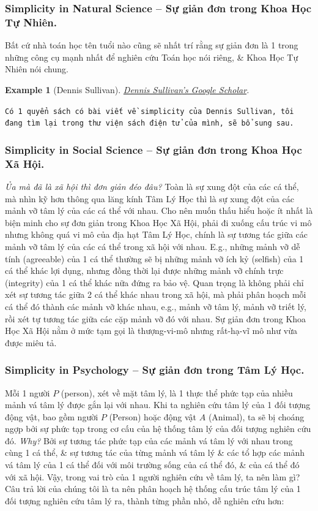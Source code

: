 \documentclass[12pt,twoside]{book}
\newtheorem{example}{Example}
\begin{document}
\subsubsection{Simplicity in Natural Science -- Sự giản đơn trong Khoa Học Tự Nhiên.} Bất cứ nhà toán học tên tuổi nào cũng sẽ nhất trí rằng sự giản đơn là 1 trong những công cụ mạnh nhất để nghiên cứu Toán học nói riêng, \& Khoa Học Tự Nhiên nói chung.

\begin{example}[{\sc Dennis Sullivan}]
	\href{https://scholar.google.com/citations?user=0l0z5wgAAAAJ&hl=en}{{\sc Dennis Sullivan}'s Google Scholar}.
\end{example}
{\tt Có 1 quyển sách có bài viết về simplicity của {\sc Dennis Sullivan}, tôi đang tìm lại trong thư viện sách điện tử của mình, sẽ bổ sung sau.}

\subsubsection{Simplicity in Social Science -- Sự giản đơn trong Khoa Học Xã Hội.}
{\it Ủa mà đã là xã hội thì đơn giản đéo đâu?} Toàn là sự xung đột của các cá thể, mà nhìn kỹ hơn thông qua lăng kính Tâm Lý Học thì là sự xung đột của các mảnh vỡ tâm lý của các cá thể với nhau. Cho nên muốn thấu hiểu hoặc ít nhất là biện minh cho sự đơn giản trong Khoa Học Xã Hội, phải đi xuống cấu trúc vi mô nhưng không quá vi mô của địa hạt Tâm Lý Học, chính là sự tương tác giữa các mảnh vỡ tâm lý của các cá thể trong xã hội với nhau. E.g., những mảnh vỡ dễ tính (agreeable) của 1 cá thể thường sẽ bị những mảnh vỡ ích kỷ (selfish) của 1 cá thể khác lợi dụng, nhưng đồng thời lại được những mảnh vỡ chính trực (integrity) của 1 cá thể khác nữa đứng ra bảo vệ. Quan trọng là không phải chỉ xét sự tương tác giữa 2 cá thể khác nhau trong xã hội, mà phải phân hoạch mỗi cá thể đó thành các mảnh vỡ khác nhau, e.g., mảnh vỡ tâm lý, mảnh vỡ triết lý, rồi xét tự tương tác giữa các cặp mảnh vỡ đó với nhau. Sự giản đơn trong Khoa Học Xã Hội nằm ở mức tạm gọi là thượng-vi-mô nhưng rất-hạ-vĩ mô như vừa được miêu tả.

\subsubsection{Simplicity in Psychology -- Sự giản đơn trong Tâm Lý Học.} Mỗi 1 người $P$ (person), xét về mặt tâm lý, là 1 thực thể phức tạp của nhiều mảnh vá tâm lý được gắn lại với nhau. Khi ta nghiên cứu tâm lý của 1 đối tượng động vật, bao gồm người $P$ (Person) hoặc động vật $A$ (Animal), ta sẽ bị choáng ngợp bởi sự phức tạp trong cơ cấu của hệ thống tâm lý của đối tượng nghiên cứu đó. {\it Why?} Bởi sự tương tác phức tạp của các mảnh vá tâm lý với nhau trong cùng 1 cá thể, \& sự tương tác của từng mảnh vá tâm lý \& các tổ hợp các mảnh vá tâm lý của 1 cá thể đối với môi trường sống của cá thể đó, \& của cá thể đó với xã hội. Vậy, trong vai trò của 1 người nghiên cứu về tâm lý, ta nên làm gì? Câu trả lời của chúng tôi là ta nên phân hoạch hệ thống cấu trúc tâm lý của 1 đối tượng nghiên cứu tâm lý ra, thành từng phần nhỏ, dễ nghiên cứu hơn: 
\end{document}
